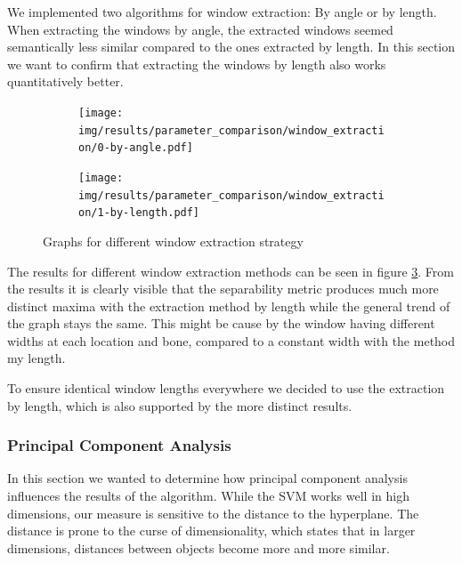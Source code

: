 \documentclass[pdftex,12pt,a4paper]{report}
\begin{document}
We implemented two algorithms for window extraction: By angle or by length. When extracting the windows by angle, the extracted windows seemed semantically less similar compared to the ones extracted by length. In this section we want to confirm that extracting the windows by length also works quantitatively better.

\begin{figure}[h]
	\centering
	\begin{subfigure}[b]{0.32\textwidth}
		\centering
		\texttt{[image: img/results/parameter\_comparison/window\_extraction/0-by-angle.pdf]}
		\label{fig:window-extraction-graphs-0}
	\end{subfigure}
	\begin{subfigure}[b]{0.32\textwidth}
		\centering
		\texttt{[image: img/results/parameter\_comparison/window\_extraction/1-by-length.pdf]}
		\label{fig:window-extraction-graphs-1}
	\end{subfigure}
	\caption{Graphs for different window extraction strategy}
	\label{fig:window-extraction-graphs}
\end{figure}

The results for different window extraction methods can be seen in figure \ref{fig:window-extraction-graphs}. From the results it is clearly visible that the separability metric produces much more distinct maxima with the extraction method by length while the general trend of the graph stays the same. This might be cause by the window having different widths at each location and bone, compared to a constant width with the method my length.

To ensure identical window lengths everywhere we decided to use the extraction by length, which is also supported by the more distinct results.

\subsubsection{Principal Component Analysis}

In this section we wanted to determine how principal component analysis influences the results of the algorithm. While the SVM works well in high dimensions, our measure is sensitive to the distance to the hyperplane. The distance is prone to the curse of dimensionality, which states that in larger dimensions, distances between objects become more and more similar.
\end{document}
